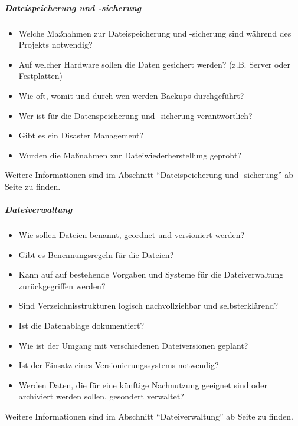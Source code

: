 \subparagraph{Dateispeicherung und -sicherung}
\begin{itemize}
    \item Welche Maßnahmen zur Dateispeicherung und -sicherung sind während des Projekts notwendig?
    \item Auf welcher Hardware sollen die Daten gesichert werden? (z.B. Server oder Festplatten)
    \item Wie oft, womit und durch wen werden Backups durchgeführt?
    \item Wer ist für die Datenspeicherung und -sicherung verantwortlich?
    \item Gibt es ein Disaster Management?
    \item Wurden die Maßnahmen zur Dateiwiederherstellung geprobt?
\end{itemize}
Weitere Informationen sind im Abschnitt "`Dateispeicherung und -sicherung"' ab Seite \pageref{dateispeicherung} zu finden.

\subparagraph{Dateiverwaltung}
\begin{itemize}
    \item Wie sollen Dateien benannt, geordnet und versioniert werden?
    \item Gibt es Benennungsregeln für die Dateien?
    \item Kann auf auf bestehende Vorgaben und Systeme für die Dateiverwaltung zurückgegriffen werden?
    \item Sind Verzeichnisstrukturen logisch nachvollziehbar und selbsterklärend?
    \item Ist die Datenablage dokumentiert?
    \item Wie ist der Umgang mit verschiedenen Dateiversionen geplant?
    \item Ist der Einsatz eines Versionierungssystems notwendig?
    \item Werden Daten, die für eine künftige Nachnutzung geeignet sind oder archiviert werden sollen, gesondert verwaltet?
\end{itemize}
Weitere Informationen sind im Abschnitt "`Dateiverwaltung"' ab Seite \pageref{dateiverwaltung} zu finden.

